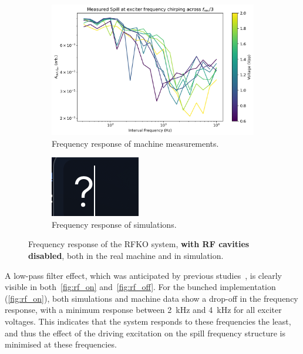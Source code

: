 \documentclass[11pt]{report}
\begin{document}
\begin{figure}[h]
  \centering
  \begin{subfigure}[b]{0.9\linewidth}
    \includegraphics*[width=\linewidth]{machine_rf_off.png}
    \caption{Frequency response of machine measurements.}
  \end{subfigure}
  \begin{subfigure}[b]{0.9\linewidth}
    \includegraphics*[width=\linewidth]{sim_rf_off.png}
    \caption{Frequency response of simulations.}
  \end{subfigure}
  \caption{Frequency response of the RFKO system, \textbf{with RF cavities disabled}, both in the real machine and in simulation.}\label{fig:rf_off}
\end{figure}

A low-pass filter effect, which was anticipated by previous studies~\cite{wepmp008}, is clearly visible in both~\autoref{fig:rf_on} and~\autoref{fig:rf_off}. For the bunched implementation (\autoref{fig:rf_on}), both simulations and machine data show a drop-off in the frequency response, with a minimum response between \qty{2}{\kilo\hertz} and \qty{4}{\kilo\hertz} for all exciter voltages. This indicates that the system responds to these frequencies the least, and thus the effect of the driving excitation on the spill frequency structure is minimised at these frequencies. 
\end{document}
